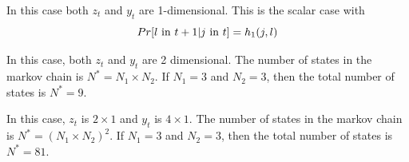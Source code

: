 \bye

 In this case both $z_t$
and $y_t$ are 1-dimensional.  This is the scalar case with
$$
   Pr[l\ {\rm in \ } t+1 | j\ {\rm in \ } t ] = h_1(j,l)
$$



In this case, both $z_t$ and $y_t$ are 2 dimensional.
The number of states in the markov chain is $N^*=N_1\times N_2$.
If $N_1=3$ and $N_2=3$, then the total number of states is
$N^*=9$.

In this case, $z_t$ is $2\times 1$ and $y_t$ is $4\times 1$.
The number of states in the markov chain is $N^*=(N_1\times N_2)^2$.
If $N_1=3$ and $N_2=3$, then the total number of states is
$N^*=81$.

   

\bye

